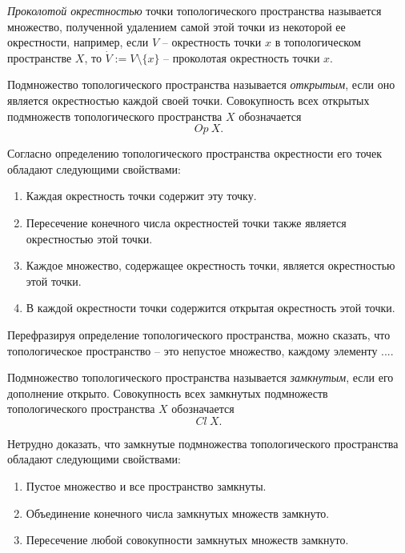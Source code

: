 \begin{definition}
	\emph{Проколотой окрестностью} точки топологического пространства называется множество, полученной удалением самой этой точки из некоторой ее окрестности, например, если $V$ -- окрестность точки $x$ в топологическом пространстве $X$, то $\dot{V} := V \setminus \{x\} $ -- проколотая окрестность точки $x$.
\end{definition}

\begin{definition}
	Подмножество топологического пространства называется \emph{открытым}, если оно является окрестностью каждой своей точки. Совокупность всех открытых подмножеств топологического пространства $X$ обозначается
	\[
		Op \ X.
	\]
\end{definition}

\begin{remark}
	Согласно определению топологического пространства окрестности его точек обладают следующими свойствами:
	\begin{enumerate}
		\item Каждая окрестность точки содержит эту точку.
		\item Пересечение конечного числа окрестностей точки также является окрестностью этой точки.
		\item Каждое множество, содержащее окрестность точки, является окрестностью этой точки.
		\item В каждой окрестности точки содержится открытая окрестность этой точки.
	\end{enumerate}

	Перефразируя определение топологического пространства, можно сказать, что топологическое пространство -- это непустое множество, каждому элементу ....
\end{remark}

\begin{definition}
	Подмножество топологического пространства называется \emph{замкнутым}, если его дополнение открыто. Совокупность всех замкнутых подмножеств топологического пространства $X$ обозначается
	\[
		Cl \ X.
	\]
\end{definition}

\begin{remark}
	Нетрудно доказать, что замкнутые подмножества топологического пространства обладают следующими свойствами:
	\begin{enumerate}
		\item Пустое множество и все пространство замкнуты.
		\item Объединение конечного числа замкнутых множеств замкнуто.
		\item Пересечение любой совокупности замкнутых множеств замкнуто.
	\end{enumerate}
\end{remark}

